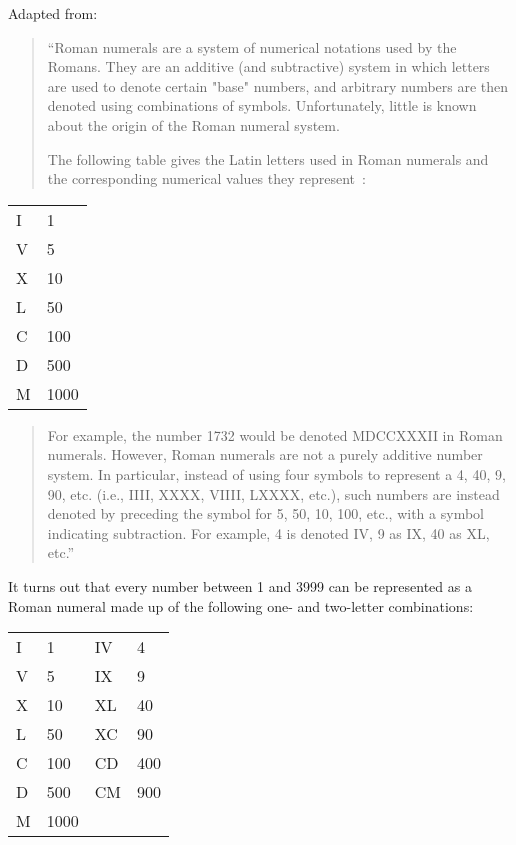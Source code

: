 
Adapted from:\\

\begin{quote}
``Roman numerals are a system of numerical notations used by the
Romans. They are an additive (and subtractive) system in which
letters are used to denote certain "base" numbers, and arbitrary
numbers are then denoted using combinations of symbols.
Unfortunately, little is known about the origin of the Roman numeral
system.

The following table gives the Latin letters used in Roman numerals
and the corresponding numerical values they represent~:
\end{quote}

\begin{center}
\begin{tabular}{|l|l|}\hline
I   &   1\\
V   &   5\\
X   &   10\\
L   &   50\\
C   &  100\\
D   &  500\\
M   & 1000\\
\hline
\end{tabular}
\end{center}

\begin{quote}
For example, the number 1732 would be denoted MDCCXXXII in Roman
numerals. However, Roman numerals are not a purely additive number
system. In particular, instead of using four symbols to represent a
4, 40, 9, 90, etc. (i.e., IIII, XXXX, VIIII, LXXXX, etc.), such
numbers are instead denoted by preceding the symbol for 5, 50, 10,
100, etc., with a symbol indicating subtraction. For example, 4 is
denoted IV, 9 as IX, 40 as XL, etc.''
\end{quote}

It turns out that every number between 1 and 3999 can be represented
as a Roman numeral made up of the following one- and two-letter
combinations:

\begin{center}
\begin{tabular}{|l|l|l|l|}\hline
I   &   1  & IV  &    4\\
V   &   5  & IX  &    9\\
X   &   10 & XL  &   40\\
L   &   50 & XC  &   90\\
C   &  100 & CD  &  400\\
D   &  500 & CM  &  900\\
M   & 1000 &     &     \\ \hline
\end{tabular}
\end{center}

